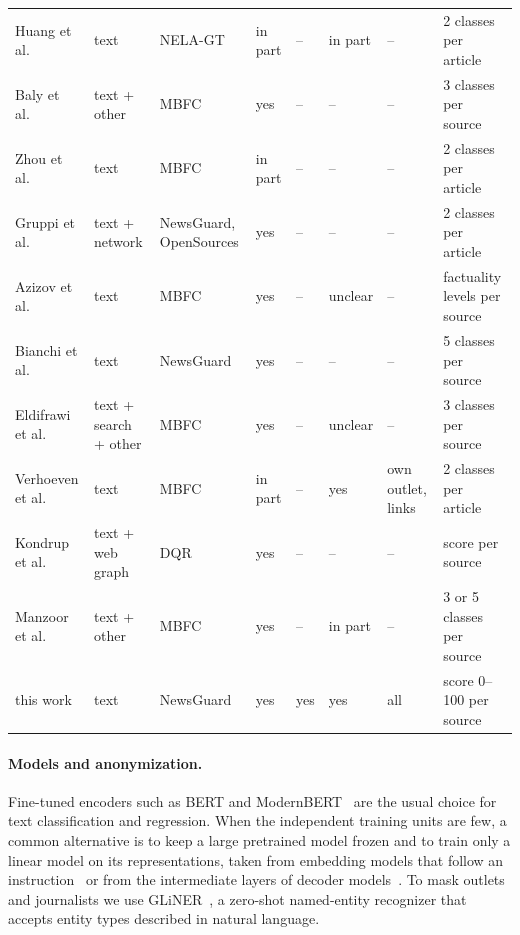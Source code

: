 \documentclass[11pt,a4paper]{article}
\begin{document}
\begin{table}[t]
{\begin{tabular}{llllllll}
Huang et al.~\cite{huang2020conquering} & text & NELA-GT & in part & -- & in part & -- & 2 classes per article \\
Baly et al.~\cite{baly2020written} & text + other & MBFC & yes & -- & -- & -- & 3 classes per source \\
Zhou et al.~\cite{zhou2021hidden} & text & MBFC & in part & -- & -- & -- & 2 classes per article \\
Gruppi et al.~\cite{gruppi2021tell} & text + network & NewsGuard, OpenSources & yes & -- & -- & -- & 2 classes per article \\
Azizov et al.~\cite{azizov-etal-2024-safari} & text & MBFC & yes & -- & unclear & -- & factuality levels per source \\
Bianchi et al.~\cite{bianchi2026articles} & text & NewsGuard & yes & -- & -- & -- & 5 classes per source \\
Eldifrawi et al.~\cite{eldifrawi2026temporal} & text + search + other & MBFC & yes & -- & unclear & -- & 3 classes per source \\
Verhoeven et al.~\cite{verhoeven2025yesterday} & text & MBFC & in part & -- & yes & own outlet, links & 2 classes per article \\
Kondrup et al.~\cite{kondrup2026credibench} & text + web graph & DQR & yes & -- & -- & -- & score per source \\
Manzoor et al.~\cite{manzoor2026multiview} & text + other & MBFC & yes & -- & in part & -- & 3 or 5 classes per source \\
\midrule
this work & text & NewsGuard & yes & yes & yes & all & score 0--100 per source \\
\bottomrule
\end{tabular}}
\end{table}

\paragraph{Models and anonymization.} Fine-tuned encoders such as BERT and
ModernBERT~\cite{devlin2019bert,warner2024modernbert} are the usual choice for text classification and regression. When
the independent training units are few, a common alternative is to keep a large pretrained model frozen and to train only
a linear model on its representations, taken from embedding models that follow an instruction~\cite{zhang2025qwen3} or
from the intermediate layers of decoder models~\cite{skean2025layer}. To mask outlets and journalists we use
GLiNER~\cite{zaratiana2024gliner}, a zero-shot named-entity recognizer that accepts entity types described in natural
language.
\end{document}
